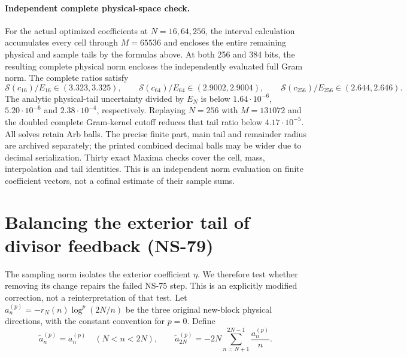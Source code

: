 \paragraph{Independent complete physical-space check.}
For the actual optimized coefficients at $N=16,64,256$, the interval
calculation accumulates every cell through $M=65536$ and encloses the
entire remaining physical and sample tails by the formulas above.
At both 256 and 384 bits, the resulting complete physical norm encloses
the independently evaluated full Gram norm. The complete ratios satisfy
\[
 \mathcal S(c_{16})/E_{16}\in(3.323,3.325),\qquad
 \mathcal S(c_{64})/E_{64}\in(2.9002,2.9004),\qquad
 \mathcal S(c_{256})/E_{256}\in(2.644,2.646).
\]
The analytic physical-tail uncertainty divided by $E_N$ is below
$1.64\cdot10^{-6}$, $5.20\cdot10^{-6}$ and $2.38\cdot10^{-4}$,
respectively. Replaying $N=256$ with $M=131072$ and the doubled complete
Gram-kernel cutoff reduces that tail ratio below $4.17\cdot10^{-5}$.
All solves retain Arb balls. The precise finite part, main tail and
remainder radius are archived separately; the printed combined decimal
balls may be wider due to decimal serialization. Thirty exact Maxima
checks cover the cell, mass, interpolation and tail identities.
This is an independent norm evaluation on finite coefficient vectors,
not a cofinal estimate of their sample sums.

\section{Balancing the exterior tail of divisor feedback (NS-79)}
\label{sec:ns79-balanced-feedback}

The sampling norm isolates the exterior coefficient $\eta$. We therefore
test whether removing its change repairs the failed NS-75 step. This is
an explicitly modified correction, not a reinterpretation of that test.
Let $a_n^{(p)}=-r_N(n)\log^p(2N/n)$ be the three original new-block
physical directions, with the constant convention for $p=0$. Define
\begin{equation}
 \widetilde a_n^{(p)}=a_n^{(p)}\quad(N<n<2N),\qquad
 \widetilde a_{2N}^{(p)}=-2N\sum_{n=N+1}^{2N-1}\frac{a_n^{(p)}}n.
 \label{eq:ns79-balance}
\end{equation}

